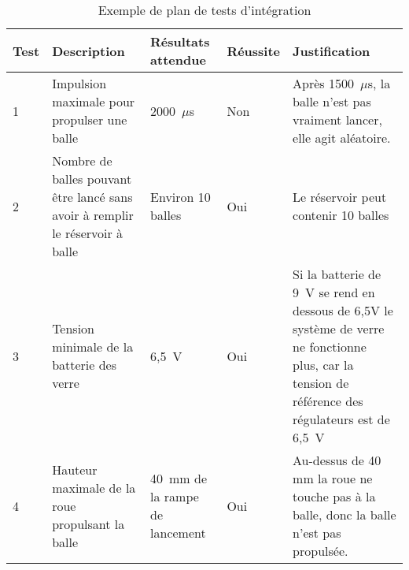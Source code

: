 \begin{table}[h!]
    \centering
    \begin{tabular}{p{0.25in}p{1.5in}p{1.5in}p{0.5in}p{1.5in}}
        \hline
        \bfseries Test & \bfseries Description & \bfseries Résultats attendue & \bfseries Réussite & \bfseries Justification \\
        \hline\hline
        1 & Impulsion maximale pour propulser une balle & 2000~$\mu$s & Non & Après 1500~$\mu$s, la balle n’est pas vraiment lancer, elle agit aléatoire. \\
        2 & Nombre de balles pouvant être lancé sans avoir à remplir le réservoir à balle & Environ 10 balles & Oui & Le réservoir peut contenir 10 balles \\
        3 & Tension minimale de la batterie des verre & 6,5~V & Oui & Si la batterie de 9~V se rend en dessous de 6,5V le système de verre ne fonctionne plus, car la tension de référence des régulateurs est de 6,5~V \\
        4 & Hauteur maximale de la roue propulsant la balle & 40~mm de la rampe de lancement & Oui & Au-dessus de 40 mm la roue ne touche pas à la balle, donc la balle n’est pas propulsée. \\
        \hline
    \end{tabular}
    \caption{Exemple de plan de tests d'intégration}
    \label{tab:s3-test-integration}
\end{table}
